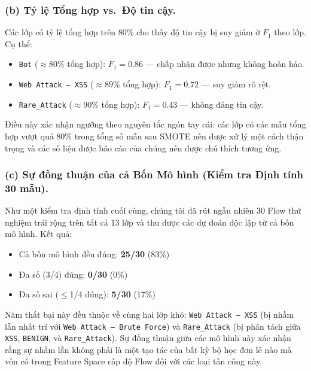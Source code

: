 \subsubsection*{(b) Tỷ lệ Tổng hợp vs.\ Độ tin cậy.}
Các lớp có tỷ lệ tổng hợp trên 80\% cho thấy độ tin cậy bị suy giảm ở $F_1$ theo lớp. Cụ thể:
\begin{itemize}
    \item \texttt{Bot} ($\approx 80\%$ tổng hợp): $F_1 = 0.86$ --- chấp nhận được nhưng không hoàn hảo.
    \item \texttt{Web Attack -- XSS} ($\approx 89\%$ tổng hợp): $F_1 = 0.72$ --- suy giảm rõ rệt.
    \item \texttt{Rare\_Attack} ($\approx 90\%$ tổng hợp): $F_1 = 0.43$ --- không đáng tin cậy.
\end{itemize}
Điều này xác nhận ngưỡng theo nguyên tắc ngón tay cái: các lớp có các mẫu tổng hợp vượt quá 80\% trong tổng số mẫu sau SMOTE nên được xử lý một cách thận trọng và các số liệu được báo cáo của chúng nên được chú thích tương ứng.

\subsubsection*{(c) Sự đồng thuận của cả Bốn Mô hình (Kiểm tra Định tính 30 mẫu).}
Như một kiểm tra định tính cuối cùng, chúng tôi đã rút ngẫu nhiên 30 Flow thử nghiệm trải rộng trên tất cả 13 lớp và thu được các dự đoán độc lập từ cả bốn mô hình. Kết quả:
\begin{itemize}
    \item Cả bốn mô hình đều đúng: \textbf{25/30} (83\%)
    \item Đa số (3/4) đúng: \textbf{0/30} (0\%)
    \item Đa số sai ($\leq$1/4 đúng): \textbf{5/30} (17\%)
\end{itemize}
Năm thất bại này đều thuộc về cùng hai lớp khó: \texttt{Web Attack -- XSS} (bị nhầm lẫn nhất trí với \texttt{Web Attack -- Brute Force}) và \texttt{Rare\_Attack} (bị phân tách giữa \texttt{XSS}, \texttt{BENIGN}, và \texttt{Rare\_Attack}). Sự đồng thuận giữa các mô hình này xác nhận rằng sự nhầm lẫn không phải là một tạo tác của bất kỳ bộ học đơn lẻ nào mà vốn có trong Feature Space cấp độ Flow đối với các loại tấn công này.
